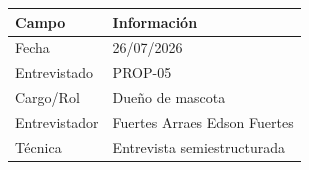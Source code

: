 \documentclass[journal,onecolumn]{IEEEtran}
\begin{document}
	\begin{table}[H]
		\centering\small
		\begin{tabularx}{\textwidth}{@{}l X@{}}
			\toprule
			\textbf{Campo} & \textbf{Información} \\
			\midrule
			
			Fecha & 26/07/2026 \\
			
			Entrevistado & PROP-05 \\
			
			Cargo/Rol & Dueño de mascota \\
			
			Entrevistador & Fuertes Arraes Edson Fuertes \\
			
			Técnica & Entrevista semiestructurada \\
			
			\bottomrule
		\end{tabularx}
	\end{table}
	
\end{document}
